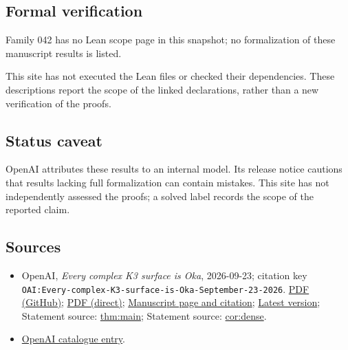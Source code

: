 \documentclass[11pt]{article}
\begin{document}
\subsection{Formal verification}
Family 042 has no Lean scope page in this snapshot; no formalization of these manuscript results is listed.

This site has not executed the Lean files or checked their dependencies. These descriptions report the scope of the linked declarations, rather than a new verification of the proofs.

\subsection{Status caveat}
OpenAI attributes these results to an internal model. Its release notice cautions that results lacking full formalization can contain mistakes. This site has not independently assessed the proofs; a solved label records the scope of the reported claim.

\subsection{Sources}
\begin{itemize}
\item OpenAI, \emph{Every complex K3 surface is Oka}, 2026-09-23; citation key \texttt{OAI:Every-complex-K3-surface-is-Oka-September-23-2026}. \href{https://github.com/openai/math/blob/adc7f1241b42e322a6451854ab7e4b4c146bf78a/preprints/Every-complex-K3-surface-is-Oka-September-23-2026/paper.pdf}{PDF (GitHub)}; \href{https://github.com/openai/math/raw/adc7f1241b42e322a6451854ab7e4b4c146bf78a/preprints/Every-complex-K3-surface-is-Oka-September-23-2026/paper.pdf}{PDF (direct)}; \href{https://github.com/openai/math/blob/adc7f1241b42e322a6451854ab7e4b4c146bf78a/preprints/Every-complex-K3-surface-is-Oka-September-23-2026/README.md}{Manuscript page and citation}; \href{https://github.com/openai/math/blob/main/preprints/Every-complex-K3-surface-is-Oka-September-23-2026/paper.pdf}{Latest version}; Statement source: \href{https://github.com/openai/math/blob/adc7f1241b42e322a6451854ab7e4b4c146bf78a/preprints/Every-complex-K3-surface-is-Oka-September-23-2026/build/sections/introduction.tex\#L20}{thm:main}; Statement source: \href{https://github.com/openai/math/blob/adc7f1241b42e322a6451854ab7e4b4c146bf78a/preprints/Every-complex-K3-surface-is-Oka-September-23-2026/build/sections/introduction.tex\#L43}{cor:dense}.
\item \href{https://github.com/openai/math/blob/adc7f1241b42e322a6451854ab7e4b4c146bf78a/CONTENTS.md}{OpenAI catalogue entry}.
\end{itemize}
\end{document}
